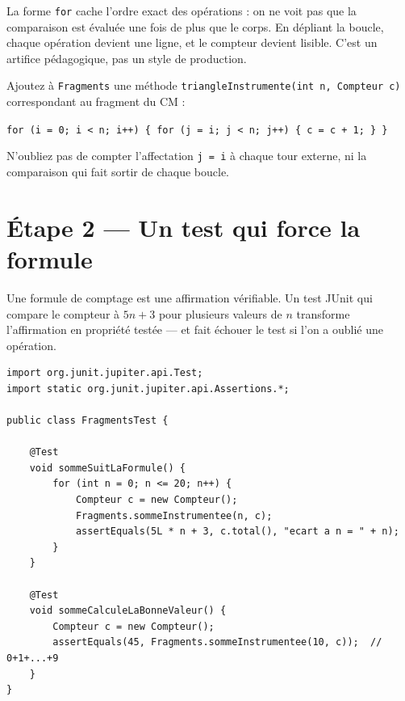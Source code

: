\documentclass[11pt,a4paper]{article}
\begin{document}
\begin{infobox}
La forme \texttt{for} cache l'ordre exact des opérations : on ne voit pas
que la comparaison est évaluée une fois de plus que le corps. En dépliant
la boucle, chaque opération devient une ligne, et le compteur devient
lisible. C'est un artifice pédagogique, pas un style de production.
\end{infobox}

\begin{exercicebox}
Ajoutez à \texttt{Fragments} une méthode \texttt{triangleInstrumente(int n,
Compteur c)} correspondant au fragment du CM :

\begin{center}
\texttt{for (i = 0; i < n; i++) \{ for (j = i; j < n; j++) \{ c = c + 1; \} \}}
\end{center}

N'oubliez pas de compter l'affectation \texttt{j = i} à chaque tour externe,
ni la comparaison qui fait sortir de chaque boucle.
\end{exercicebox}

\section{Étape 2 --- Un test qui force la formule}

\begin{lienbox}[Ce qu'on matérialise du CM]
Une formule de comptage est une affirmation vérifiable. Un test JUnit qui
compare le compteur à $5n+3$ pour plusieurs valeurs de $n$ transforme
l'affirmation en propriété testée --- et fait échouer le test si l'on a
oublié une opération.
\end{lienbox}

\begin{lstlisting}[caption={\texttt{src/test/java/FragmentsTest.java}}]
import org.junit.jupiter.api.Test;
import static org.junit.jupiter.api.Assertions.*;

public class FragmentsTest {

    @Test
    void sommeSuitLaFormule() {
        for (int n = 0; n <= 20; n++) {
            Compteur c = new Compteur();
            Fragments.sommeInstrumentee(n, c);
            assertEquals(5L * n + 3, c.total(), "ecart a n = " + n);
        }
    }

    @Test
    void sommeCalculeLaBonneValeur() {
        Compteur c = new Compteur();
        assertEquals(45, Fragments.sommeInstrumentee(10, c));  // 0+1+...+9
    }
}
\end{lstlisting}
\end{document}
